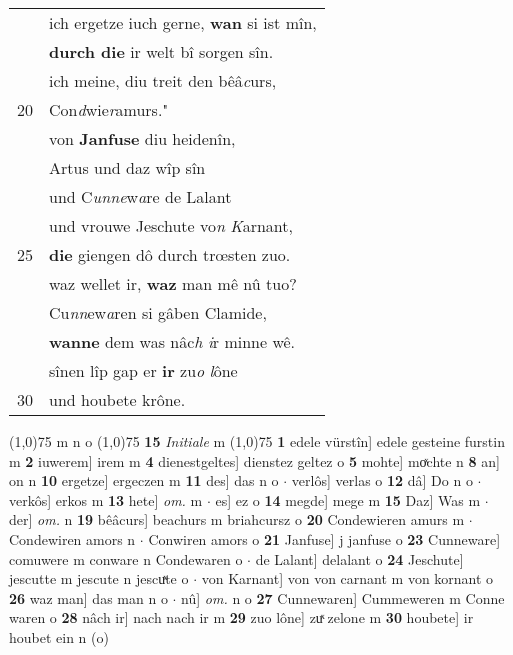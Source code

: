 \documentclass[8pt,a4paper,notitlepage]{article}
\begin{document}
\begin{table}[ht]
\begin{minipage}[t]{0.5\linewidth}
\begin{tabular}{rl}
 & ich ergetze iuch gerne, \textbf{wan} si ist mîn,\\ 
 & \textbf{durch die} ir welt bî sorgen sîn.\\ 
 & ich meine, diu treit den bêâ\textit{c}urs,\\ 
20 & Con\textit{d}wie\textit{r}amurs."\\ 
 & von \textbf{Janfuse} diu heidenîn,\\ 
 & Artus und daz wîp sîn\\ 
 & und C\textit{unne}w\textit{a}re de Lalant\\ 
 & und vrouwe Jeschute vo\textit{n} \textit{K}arnant,\\ 
25 & \textbf{die} giengen dô durch trœsten zuo.\\ 
 & waz wellet ir, \textbf{waz} man mê nû tuo?\\ 
 & Cu\textit{nn}ew\textit{a}ren si gâben Clamide,\\ 
 & \textbf{wanne} dem was nâc\textit{h} \textit{i}r minne wê.\\ 
 & sînen lîp gap er \textbf{ir} zu\textit{o} \textit{l}ône\\ 
30 & und houbete krône.\\ 
\end{tabular}
\scriptsize
\line(1,0){75} \newline
m n o \newline
\line(1,0){75} \newline
\textbf{15} \textit{Initiale} m  \newline
\line(1,0){75} \newline
\textbf{1} edele vürstîn] edele gesteine furstin m \textbf{2} iuwerem] irem m \textbf{4} dienestgeltes] dienstez geltez o \textbf{5} mohte] moͯchte n \textbf{8} an] on n \textbf{10} ergetze] ergeczen m \textbf{11} des] das n o  $\cdot$ verlôs] verlas o \textbf{12} dâ] Do n o  $\cdot$ verkôs] erkos m \textbf{13} hete] \textit{om.} m  $\cdot$ es] ez o \textbf{14} megde] mege m \textbf{15} Daz] Was m  $\cdot$ der] \textit{om.} n \textbf{19} bêâcurs] beachurs m briahcursz o \textbf{20} Condewieren amurs m  $\cdot$ Condewiren amors n  $\cdot$ Conwiren amors o \textbf{21} Janfuse] j janfuse o \textbf{23} Cunneware] comuwere m conware n Condewaren o  $\cdot$ de Lalant] delalant o \textbf{24} Jeschute] jescutte m jescute n jescuͯte o  $\cdot$ von Karnant] von von carnant m von kornant o \textbf{26} waz man] das man n o  $\cdot$ nû] \textit{om.} n o \textbf{27} Cunnewaren] Cummeweren m Conne waren o \textbf{28} nâch ir] nach nach ir m \textbf{29} zuo lône] zuͯ zelone m \textbf{30} houbete] ir houbet ein n (o) \newline
\end{minipage}
\end{table}
\end{document}
